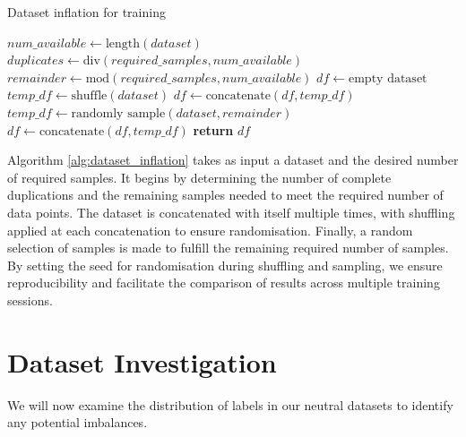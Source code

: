 \begin{algorithm}[H]
    \caption{Dataset inflation for training}
    \begin{algorithmic}[1]
        \State $num\_available \gets \text{length}(dataset)$
        \State $duplicates \gets \text{div}(required\_samples, num\_available)$
        \State $remainder \gets \text{mod}(required\_samples, num\_available)$
        \State $df \gets \text{empty dataset}$
        \State $temp\_df \gets \text{shuffle}(dataset)$
        \State $df \gets \text{concatenate}(df, temp\_df)$
        \EndFor
        \State
        \State $temp\_df \gets \text{randomly sample}(dataset, remainder)$
        \State $df \gets \text{concatenate}(df, temp\_df)$
        \State
        \State \textbf{return} $df$
        \EndFunction
    \end{algorithmic}
    \label{alg:dataset_inflation}
\end{algorithm}

Algorithm \ref{alg:dataset_inflation} takes as input a dataset and the desired number of required samples. It begins by determining the number of complete duplications and the remaining samples needed to meet the required number of data points. The dataset is concatenated with itself multiple times, with shuffling applied at each concatenation to ensure randomisation. Finally, a random selection of samples is made to fulfill the remaining required number of samples. By setting the seed for randomisation during shuffling and sampling, we ensure reproducibility and facilitate the comparison of results across multiple training sessions.

\section{Dataset Investigation}
\label{label_imbalance}

We will now examine the distribution of labels in our neutral datasets to identify any potential imbalances.

\begin{table}[ht]
    \caption{Number of positive samples for each label across both neutral datasets}
    \label{tab:dataset-comparison}
\end{table}


